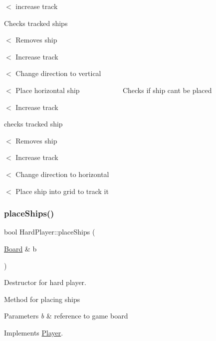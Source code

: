 $<$ increase track

Checks tracked ships

$<$ Removes ship

$<$ Increase track

$<$ Change direction to vertical

$<$ Place horizontal ship ~\newline
~\newline
~\newline
~\newline
~\newline
~\newline
~\newline
 Checks if ship can\textquotesingle{}t be placed

$<$ Increase track

checks tracked ship

$<$ Removes ship

$<$ Increase track

$<$ Change direction to horizontal

$<$ Place ship into grid to track it \mbox{\label{class_hard_player_a27d0ad3353eba585d7a93d2092036f98}} 
\subsubsection{\texorpdfstring{place\+Ships()}{placeShips()}}
{\footnotesize\ttfamily bool Hard\+Player\+::place\+Ships (\begin{DoxyParamCaption}\item[{\mbox{\hyperlink{class_board}{Board}} \&}]{b }\end{DoxyParamCaption})\hspace{0.3cm}{\ttfamily [virtual]}}



Destructor for hard player. 

Method for placing ships 
\begin{DoxyParams}{Parameters}
{\em b} & reference to game board \\
\hline
\end{DoxyParams}


Implements \mbox{\hyperlink{class_player_ab89c1180c7314d3e19bcf4b2bed2e02a}{Player}}.

\mbox{\label{class_hard_player_ae1d21325a648a88f1bf51f2b0b286190}} 

